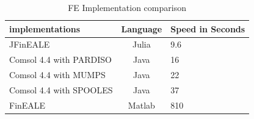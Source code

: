 \begin{appendix}
\begin{table}[htb]
\centering
\caption{FE Implementation comparison}
    \sffamily 
    \begin{tabularx}{1.0\textwidth}{l | c | p{5cm}}
        \hline
        implementations         & Language  & Speed in Seconds \\
        \hline
        JFinEALE                & Julia     & 9.6   \\
        Comsol 4.4 with PARDISO & Java      & 16    \\
        Comsol 4.4 with MUMPS   & Java      & 22    \\ 
        Comsol 4.4 with SPOOLES & Java      & 37    \\ 
        FinEALE                 & Matlab    & 810   \\
        \hline
    \end{tabularx} 
    \normalfont
    \label{table:FEComparison}
\end{table}


\end{appendix}
